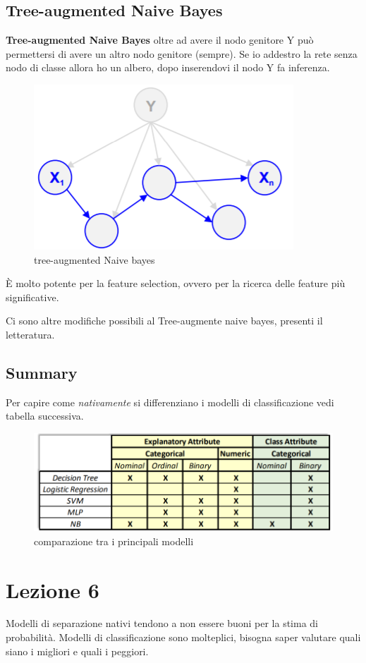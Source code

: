 \subsection{Tree-augmented Naive Bayes}
\textbf{Tree-augmented Naive Bayes} oltre ad avere il nodo genitore Y pu\`o permettersi di avere un altro nodo genitore (sempre). Se io addestro la rete senza nodo di classe allora ho un albero, dopo inserendovi il nodo Y fa inferenza. 

\begin{figure}[h!]
	\centering
	\includegraphics[height=0.35 \linewidth]{classification/pict/treenaivebayes.png}
	\caption{tree-augmented Naive bayes}
\end{figure}

\`E molto potente per la feature selection, ovvero per la ricerca delle feature pi\`u significative. 

Ci sono altre modifiche possibili al Tree-augmente naive bayes, presenti il letteratura. 
\clearpage
\subsection{Summary}
Per capire come \textit{nativamente} si differenziano i modelli di classificazione vedi tabella successiva. 

\begin{figure}[h!]
	\centering
	\includegraphics[height=0.3 \linewidth]{classification/pict/class_tecniques.png}
	\caption{comparazione tra i principali modelli}
\end{figure}


\section{Lezione 6}
Modelli di separazione nativi tendono a non essere buoni per la stima di probabilit\`a.
Modelli di classificazione sono molteplici, bisogna saper valutare quali siano i migliori e quali i peggiori.

